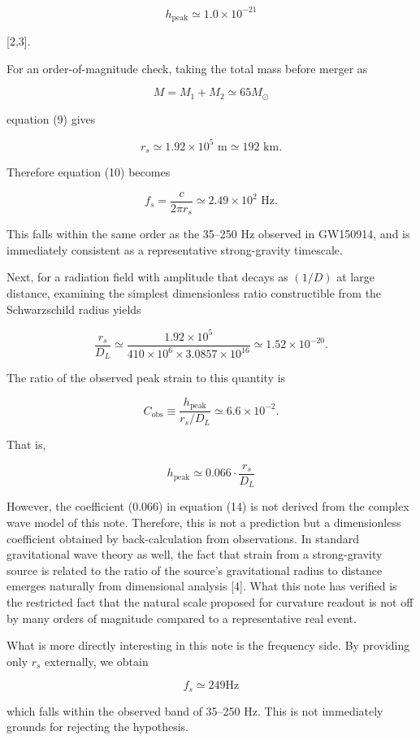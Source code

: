 \documentclass[
  a4paper,
]{article}
\begin{document}
\[h_\text{peak}\simeq1.0\times10^{-21}\]

{[}2,3{]}.

For an order-of-magnitude check, taking the total mass before merger as

\[M=M_1+M_2\simeq65M_\odot\]

equation (9) gives

\[r_s \simeq 1.92\times10^5 \text{ m} \simeq 192 \text{ km}. \tag{11}\]

Therefore equation (10) becomes

\[f_s = \frac{c}{2\pi r_s} \simeq 2.49\times10^2 \text{ Hz}. \tag{12}\]

This falls within the same order as the 35--250 Hz observed in GW150914,
and is immediately consistent as a representative strong-gravity
timescale.

Next, for a radiation field with amplitude that decays as \((1/D)\) at
large distance, examining the simplest dimensionless ratio constructible
from the Schwarzschild radius yields

\[\frac{r_s}{D_L} \simeq \frac{1.92\times10^5}{410\times10^6\times3.0857\times10^{16}} \simeq 1.52\times10^{-20}. \tag{13}\]

The ratio of the observed peak strain to this quantity is

\[C_\text{obs} \equiv \frac{h_\text{peak}}{r_s/D_L} \simeq 6.6\times10^{-2}. \tag{14}\]

That is,

\[h_\text{peak} \simeq 0.066 \cdot \frac{r_s}{D_L}\]

However, the coefficient (0.066) in equation (14) is not derived from
the complex wave model of this note. Therefore, this is not a prediction
but a dimensionless coefficient obtained by back-calculation from
observations. In standard gravitational wave theory as well, the fact
that strain from a strong-gravity source is related to the ratio of the
source's gravitational radius to distance emerges naturally from
dimensional analysis {[}4{]}. What this note has verified is the
restricted fact that the natural scale proposed for curvature readout is
not off by many orders of magnitude compared to a representative real
event.

What is more directly interesting in this note is the frequency side. By
providing only \(r_s\) externally, we obtain

\[f_s\simeq249 \text{Hz}\]

which falls within the observed band of 35--250 Hz. This is not
immediately grounds for rejecting the hypothesis.
\end{document}
